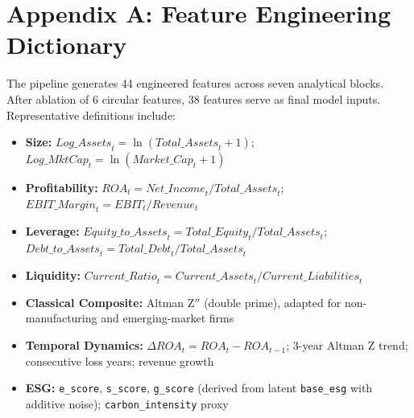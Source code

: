 \documentclass[sigconf,anonymous]{acmart}
\begin{document}
\section*{Appendix A: Feature Engineering Dictionary}
The pipeline generates 44 engineered features across seven analytical blocks. After ablation of 6 circular features, 38 features serve as final model inputs. Representative definitions include:
\begin{itemize}
    \item \textbf{Size:} $\textit{Log\_Assets}_{t} = \ln(\textit{Total\_Assets}_t + 1)$; $\textit{Log\_MktCap}_t = \ln(\textit{Market\_Cap}_t + 1)$
    \item \textbf{Profitability:} $ROA_t = \textit{Net\_Income}_t / \textit{Total\_Assets}_t$; $\textit{EBIT\_Margin}_t = EBIT_t / \textit{Revenue}_t$
    \item \textbf{Leverage:} $\textit{Equity\_to\_Assets}_t = \textit{Total\_Equity}_t / \textit{Total\_Assets}_t$; $\textit{Debt\_to\_Assets}_t = \textit{Total\_Debt}_t / \textit{Total\_Assets}_t$
    \item \textbf{Liquidity:} $\textit{Current\_Ratio}_t = \textit{Current\_Assets}_t / \textit{Current\_Liabilities}_t$
    \item \textbf{Classical Composite:} Altman Z$''$ (double prime), adapted for non-manufacturing and emerging-market firms
    \item \textbf{Temporal Dynamics:} $\Delta ROA_{t} = ROA_t - ROA_{t-1}$; 3-year Altman Z trend; consecutive loss years; revenue growth
    \item \textbf{ESG:} \texttt{e\_score}, \texttt{s\_score}, \texttt{g\_score} (derived from latent \texttt{base\_esg} with additive noise); \texttt{carbon\_intensity} proxy
\end{itemize}
\end{document}
